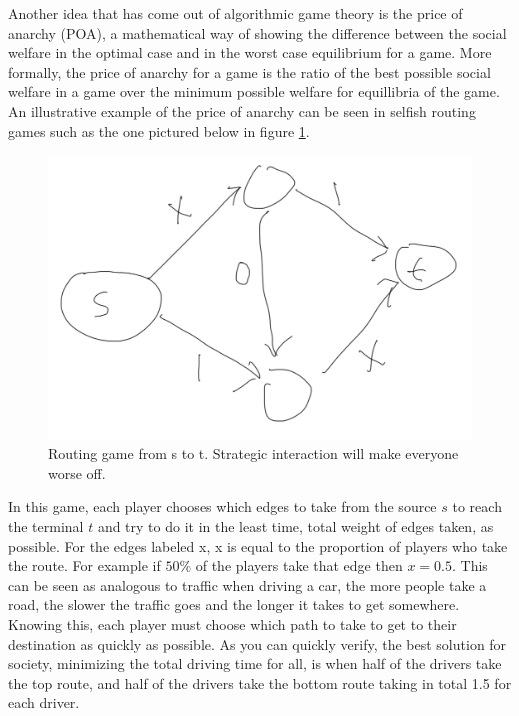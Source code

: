 \documentclass[12pt,twoside]{reedthesis}
\begin{document}
Another idea that has come out of algorithmic game theory is the price of anarchy (POA), a mathematical way of showing the difference between the social welfare in the optimal case and in the worst case equilibrium for a game. More formally, the price of anarchy for a game is the ratio of the best possible social welfare in a game over the minimum possible welfare for equillibria of the game. An illustrative example of the price of anarchy can be seen in selfish routing games such as the one pictured below in figure \ref{braess}. 
\begin{figure}[h!]
	\centering
	\includegraphics[scale=0.4]{braess}
	\caption{Routing game from s to t. Strategic interaction will make everyone worse off.}
	\label{braess}
\end{figure}
In this game, each player chooses which edges to take from the source $s$ to reach the terminal $t$ and try to do it in the least time, total weight of edges taken, as possible. For the edges labeled x, x is equal to the proportion of players who take the route. For example if $50 \%$ of the players take that edge then $x=0.5$. This can be seen as analogous to traffic when driving a car, the more people take a road, the slower the traffic goes and the longer it takes to get somewhere. Knowing this, each player must choose which path to take to get to their destination as quickly as possible. As you can quickly verify, the best solution for society, minimizing the total driving time for all, is when half of the drivers take the top route, and half of the drivers take the bottom route taking in total 1.5 for each driver. 
\end{document}
